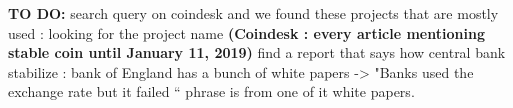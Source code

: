 \begin{itemize}
\textbf{TO DO:}
search query on coindesk and we found these projects that are mostly used : looking for the project name \textbf{(Coindesk : every article mentioning stable coin until January 11, 2019)}
find a report that says how central bank stabilize : bank of England has a bunch of white papers -> "Banks used the exchange rate but it failed “ phrase is from one of it white papers.

\end{itemize}






%
%
%
